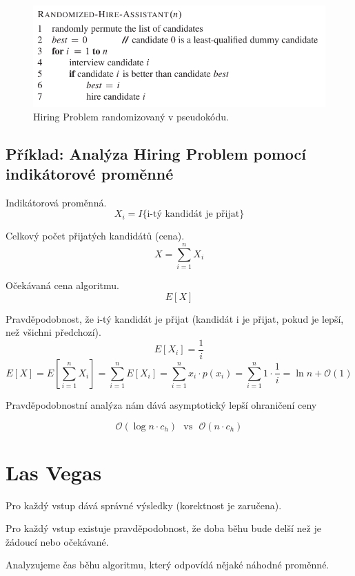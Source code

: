 \begin{figure}[H]
    \centering
    \includegraphics[width=0.8\linewidth]{hiring_problem_randomized.pdf}
    \caption{Hiring Problem randomizovaný v pseudokódu.}
\end{figure}

\subsection{Příklad: Analýza Hiring Problem pomocí indikátorové proměnné}

\begin{compactitem}
    \item Indikátorová proměnná.
    $$ X_i = I\{ \text{i-tý kandidát je přijat} \}$$

    \item Celkový počet přijatých kandidátů (cena).
    $$ X = \sum_{i=1}^n X_i$$

    \item Očekávaná cena algoritmu.
    $$ E[X] $$

    \item Pravděpodobnost, že i-tý kandidát je přijat (kandidát i je přijat, pokud je lepší, než všichni předchozí).
    $$ E[X_i] = \frac{1}{i}$$
    $$ E[X] = E \left[ \sum_{i=1}^n X_i \right] = \sum_{i=1}^n E \left[ X_i \right] = \sum_{i=1}^n x_i \cdot p(x_i) = \sum_{i=1}^n 1 \cdot \frac{1}{i} = \ln{n} + \mathcal{O}(1)$$

    \item Pravděpodobnostní analýza nám dává asymptotický lepší ohraničení ceny

    $$ \mathcal{O}(\log{n} \cdot c_h) ~~~\text{vs}~~~ \mathcal{O}(n \cdot c_h)$$
\end{compactitem}


\section{Las Vegas}

\begin{compactitem}
    \item Pro každý vstup dává správné výsledky (korektnost je zaručena).

    \item Pro každý vstup existuje pravděpodobnost, že doba běhu bude delší než je žádoucí nebo očekávané.

    \item Analyzujeme čas běhu algoritmu, který odpovídá nějaké náhodné proměnné.
\end{compactitem}

